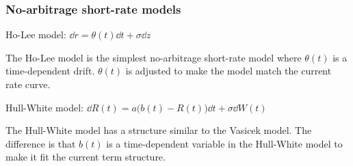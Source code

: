 \begin{solution}
\subsubsection*{No-arbitrage short-rate models}

Ho-Lee model: $\dd r=\theta(t)\dd t+\sigma\dd z$

The Ho-Lee model is the simplest no-arbitrage short-rate model where $\theta(t)$ is a
time-dependent drift. $\theta(t)$ is adjusted to make the model match the current rate curve.

Hull-White model: $\dd R(t)=a\bigl(b(t)-R(t)\bigr)\dd t+\sigma\dd W(t)$

The Hull-White model has a structure similar to the Vasicek model. The difference is
that $b(t)$ is a time-dependent variable in the Hull-White model to make it fit the current
term structure.

\end{solution}
